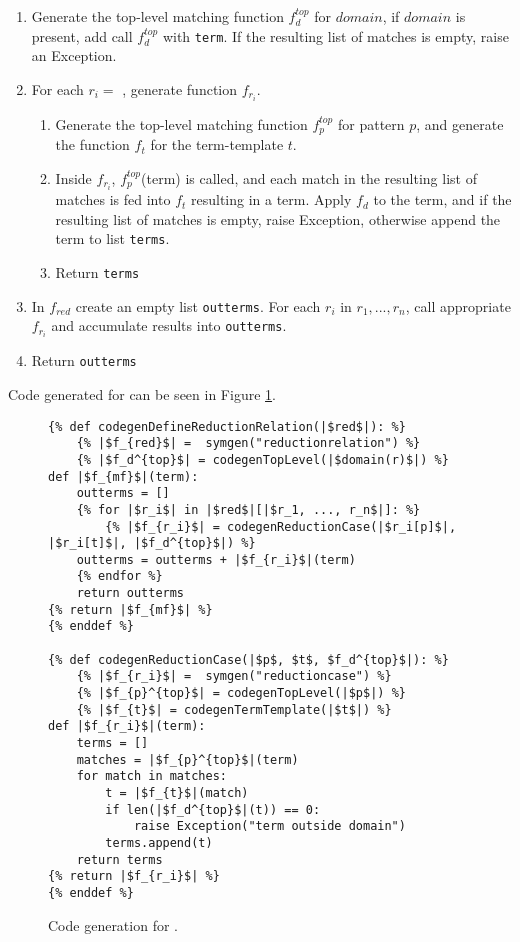 \begin{enumerate}
\item Generate the top-level matching function $f_d^{top}$ for $domain$, if $domain$ is present, add call $f_d^{top}$ with \texttt{term}. If the resulting list of matches is empty, raise an Exception.
\item For each $r_i= $ \ReductionCase, generate function $f_{r_i}$.
	\begin{enumerate}
	\item Generate the top-level matching function $f_p^{top}$ for pattern $p$, and generate the function $f_t$ for the term-template $t$.
	\item Inside $f_{r_i}$, $f_p^{top}$(term) is called, and each match in the resulting list of matches is fed into $f_t$ resulting in a term. Apply $f_d$ to the term, and if the resulting list of matches is empty, raise Exception, otherwise append the term to list \texttt{terms}.
	\item Return \texttt{terms}
	\end{enumerate}
\item In $f_{red}$ create an empty list \texttt{outterms}. For each $r_i$ in $r_1, ..., r_n$, call appropriate $f_{r_i}$ and accumulate results into \texttt{outterms}.
\item Return \texttt{outterms}
\end{enumerate}

Code generated for \DefineReductionRelationNoArgs \space can be seen in Figure \ref{codegen-define-red}.

\begin{figure}
\begin{verbatim}
{% def codegenDefineReductionRelation(|$red$|): %}
	{% |$f_{red}$| =  symgen("reductionrelation") %}
	{% |$f_d^{top}$| = codegenTopLevel(|$domain(r)$|) %}
def |$f_{mf}$|(term):
	outterms = []
	{% for |$r_i$| in |$red$|[|$r_1, ..., r_n$|]: %}
		{% |$f_{r_i}$| = codegenReductionCase(|$r_i[p]$|, |$r_i[t]$|, |$f_d^{top}$|) %}
	outterms = outterms + |$f_{r_i}$|(term)
	{% endfor %}
	return outterms
{% return |$f_{mf}$| %}
{% enddef %}

{% def codegenReductionCase(|$p$, $t$, $f_d^{top}$|): %}
	{% |$f_{r_i}$| =  symgen("reductioncase") %}
	{% |$f_{p}^{top}$| = codegenTopLevel(|$p$|) %}
	{% |$f_{t}$| = codegenTermTemplate(|$t$|) %}
def |$f_{r_i}$|(term):
	terms = []
	matches = |$f_{p}^{top}$|(term)
	for match in matches:
		t = |$f_{t}$|(match)
		if len(|$f_d^{top}$|(t)) == 0:
			raise Exception("term outside domain")
		terms.append(t)
	return terms
{% return |$f_{r_i}$| %}
{% enddef %}
\end{verbatim}
\caption{Code generation for \DefineReductionRelationNoArgs.}
\label{codegen-define-red}
\end{figure}
